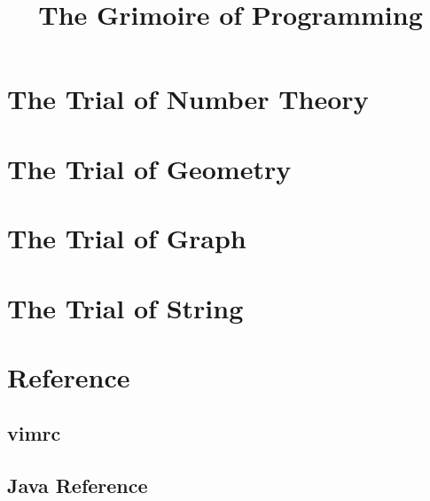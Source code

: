 \documentclass[a4paper]{report}
\title{The Grimoire of Programming}
\date{}
\author{}
\begin{document}
	\maketitle
	\chapter{The Trial of Number Theory}
		
	\chapter{The Trial of Geometry}
		
	\chapter{The Trial of Graph}
		
	\chapter{The Trial of String}
		
	\chapter{Reference}
		\section{vimrc}
			
		\section{Java Reference}
			
\end{document}
